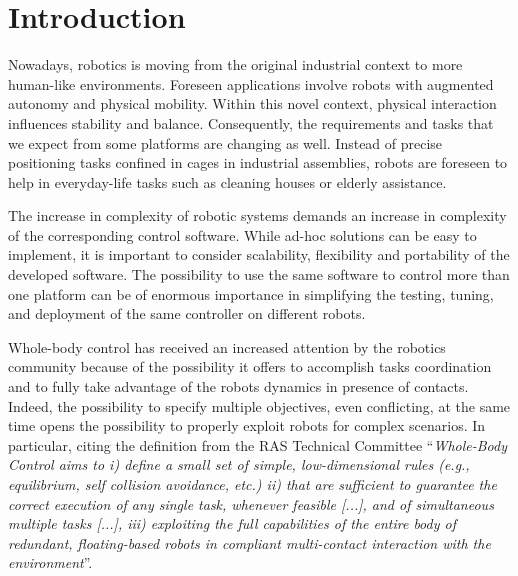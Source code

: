\section{Introduction}

Nowadays, robotics is moving from the original industrial context to more human-like environments.
Foreseen applications involve robots with augmented autonomy and physical mobility. 
Within this novel context, physical interaction influences stability and balance.
Consequently, the requirements and tasks that we expect from some platforms are changing as well. 
Instead of precise positioning tasks confined in cages in industrial assemblies, robots are foreseen to help in everyday-life tasks such as cleaning houses or elderly assistance. 

The increase in complexity of robotic systems demands an increase in complexity of the corresponding control software.
While ad-hoc solutions can be easy to implement, it is important to consider scalability, flexibility and portability of the developed software.
The possibility to use the same software to control more than one platform can be of enormous importance in simplifying the testing, tuning, and deployment of the same controller on different robots.

Whole-body control has received an increased attention by the robotics community because of the possibility it offers to accomplish tasks coordination and to fully take advantage of the robots dynamics in presence of contacts.
Indeed, the possibility to specify multiple objectives, even conflicting, at the same time opens the possibility to properly exploit robots for complex scenarios.
In particular, citing the definition from the RAS Technical Committee \cite{RAS_WBC_TC} ``\emph{Whole-Body Control aims to i) define a small set of simple, low-dimensional rules (e.g., equilibrium, self collision avoidance, etc.) ii) that are sufficient to guarantee the correct execution of any single task, whenever feasible [...], and of simultaneous multiple tasks [...], iii) exploiting the full capabilities of the entire body of redundant, floating-based robots in compliant multi-contact interaction with the environment}''.

